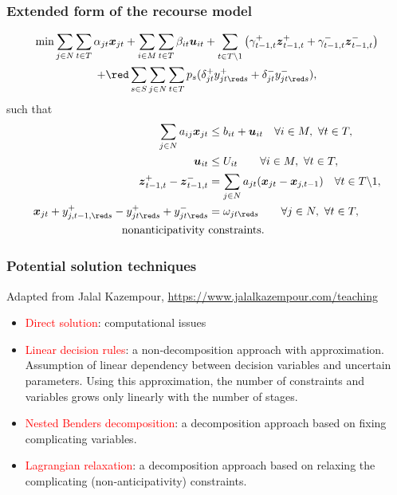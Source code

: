 \documentclass{beamer}
\def\bx{\boldsymbol{x}}
\def\bu{\boldsymbol{u}}
\def\bz{\boldsymbol{z}}
\begin{document}
\begin{frame}
\frametitle{Extended form of the recourse model}

\begin{multline*}
\min \sum_{j \in N} \sum_{t \in T} \alpha_{jt} \bx_{jt} + \sum_{i \in M}
\sum_{t \in T} \beta_{it} \bu_{it} + \sum_{t \in T\backslash 1} \left(
  \gamma^+_{t-1,t} \bz^+_{t-1,t} + \gamma^-_{t-1,t} \bz^-_{t-1,t} \right) \\
+ {\red \sum_{s \in S}}\sum_{j \in N} \sum_{t \in T} p_s
    ( \delta_{jt}^+y_{jt{\red s}}^+ + \delta_{jt}^-y_{jt{\red s}}^- ),
\end{multline*}
such that
\begin{align*}
\sum_{j \in N} a_{ij} \bx_{jt} & \leq b_{it}+\bu_{it} \quad \forall i \in
M,\ \forall t \in T,\\
\bu_{it} & \leq U_{it} \qquad \forall i \in M,\ \forall t \in T,\\
\bz^+_{t-1,t} - \bz^-_{t-1,t} &= \sum_{j \in N} a_{jt}(\bx_{jt} - \bx_{j,
  t-1}) \quad \forall t \in T\backslash 1, \\
\bx_{jt} + y_{j,t-1,{\red s}}^+ - y_{jt{\red s}}^+ + y_{jt{\red s}}^- &= \omega_{jt{\red s}} \qquad
\forall j \in N,\ \forall t \in T,\\
\mbox{nonanticipativity }& \mbox{constraints}.
\end{align*}
\end{frame}

\begin{frame}
\frametitle{Potential solution techniques}

Adapted from Jalal Kazempour, \url{https://www.jalalkazempour.com/teaching}

\begin{itemize}
\item 
\textcolor{red}{Direct solution}:
computational issues
\item 
\textcolor{red}{Linear decision rules}: 
a non‐decomposition approach with approximation.
Assumption of linear dependency between decision variables and uncertain
parameters. Using this approximation, the number of constraints and variables grows
only linearly with the number of stages.
\item 
\textcolor{red}{Nested Benders decomposition}: a decomposition approach based on fixing complicating variables.
\item 
\textcolor{red}{Lagrangian relaxation}: a decomposition approach based on relaxing the complicating (non‐anticipativity) constraints.
\end{itemize}
\end{frame}
\end{document}
